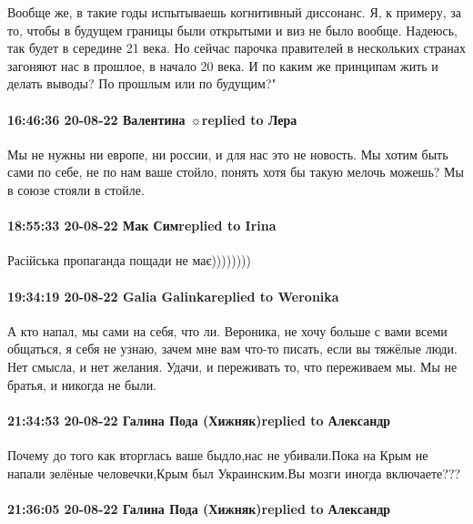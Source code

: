 Вообще же, в такие годы испытываешь когнитивный диссонанс. Я, к примеру, за то,
чтобы в будущем границы были открытыми и виз не было вообще. Надеюсь, так будет
в середине 21 века. Но сейчас парочка правителей в нескольких странах загоняют
нас в прошлое, в начало 20 века. И по каким же принципам жить и делать выводы?
По прошлым или по будущим?"

\paragraph{16:46:36 20-08-22 Валентина ☼replied to Лера}

Мы не нужны ни европе, ни россии, и для нас это не новость. Мы хотим быть сами
по себе, не по нам ваше стойло, понять хотя бы такую мелочь можешь? Мы в союзе
стояли в стойле.

\paragraph{18:55:33 20-08-22 Мак Симreplied to Irina}

Расійська пропаганда пощади не має))))))))

\paragraph{19:34:19 20-08-22 Galia Galinkareplied to Weronika}

А кто напал, мы сами на себя, что ли. Вероника, не хочу больше с вами всеми
общаться, я себя не узнаю, зачем мне вам что-то писать, если вы тяжёлые люди.
Нет смысла, и нет желания. Удачи, и переживать то, что переживаем мы. Мы не
братья, и никогда не были.

\paragraph{21:34:53 20-08-22 Галина Пода (Хижняк)replied to Александр}

Почему до того как вторглась ваше быдло,нас не убивали.Пока на Крым не напали
зелёные человечки,Крым был Украинским.Вы мозги иногда включаете???

\paragraph{21:36:05 20-08-22 Галина Пода (Хижняк)replied to Александр}


